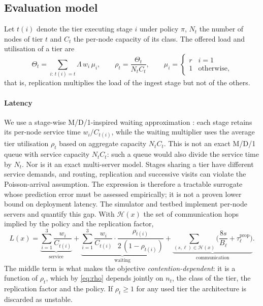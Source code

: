 \begin{table}[t]
\centering
\caption{Design variables and domain sizes of the four design-space scales.}
\label{tab:variables}

\end{table}

\subsection{Evaluation model}
Let $t(i)$ denote the tier executing stage $i$ under policy $\pi$, $N_t$ the number of
nodes of tier $t$ and $C_t$ the per-node capacity of its class. The offered load and
utilisation of a tier are
\begin{equation}
\Theta_t=\sum_{i:\,t(i)=t}\Lambda\,w_i\,\mu_i,\qquad
\rho_t=\frac{\Theta_t}{N_t C_t},\qquad
\mu_i=\begin{cases} r & i=1\\ 1 & \text{otherwise,}\end{cases}
\label{eq:rho}
\end{equation}
that is, replication multiplies the load of the ingest stage but not of the others.

\paragraph{Latency}
We use a stage-wise M/D/1-inspired waiting approximation
\cite{kleinrock1975queueing,harchol2013performance}: each stage retains its
per-node service time $w_i/C_{t(i)}$, while the waiting multiplier uses the
average tier utilisation $\rho_t$ based on aggregate capacity $N_tC_t$.
This is not an exact M/D/1 queue with service capacity $N_tC_t$: such a queue
would also divide the service time by $N_t$. Nor is it an exact multi-server
model. Stages sharing a tier have different service demands, and routing,
replication and successive visits can violate the Poisson-arrival assumption.
The expression is therefore a tractable surrogate whose prediction error must
be assessed empirically; it is not a proven lower bound on deployment latency.
The simulator and testbed implement per-node servers and quantify this gap.
With
$\mathcal{H}(x)$ the set of communication hops implied by the policy and the replication
factor,
\begin{equation}
L(x)=\underbrace{\sum_{i=1}^{3}\frac{w_i}{C_{t(i)}}}_{\text{service}}
+\underbrace{\sum_{i=1}^{3}\frac{w_i}{C_{t(i)}}\cdot\frac{\rho_{t(i)}}{2\,(1-\rho_{t(i)})}}_{\text{waiting}}
+\underbrace{\sum_{(s,\ell)\in\mathcal{H}(x)}\Big(\frac{8s}{B_\ell}+\tau^{\mathrm{prop}}_\ell\Big)}_{\text{communication}} .
\label{eq:latency}
\end{equation}
The middle term is what makes the objective \emph{contention-dependent}: it is a
function of $\rho_t$, which by \eqref{eq:rho} depends jointly on $n_t$, the class of the
tier, the replication factor and the policy. If $\rho_t\ge1$ for any used tier the
architecture is discarded as unstable.

